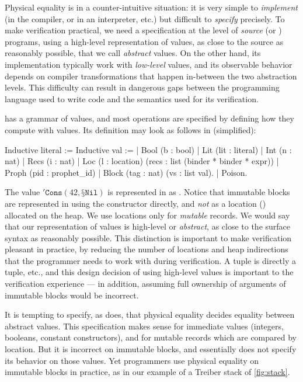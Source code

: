 Physical equality is in a counter-intuitive situation: it is very simple to \emph{implement} (in the \OCaml compiler, or in an interpreter, etc.) but difficult to \emph{specify} precisely. To make verification practical, we need a specification at the level of \emph{source} \OCaml (or \Zoo) programs, using a high-level representation of values, as close to the source as reasonably possible, that we call \emph{abstract} values. On the other hand, its implementation typically work with \emph{low-level} values, and its observable behavior depends on compiler transformations that happen in-between the two abstraction levels.
This difficulty can result in dangerous gaps between the programming language used to write code and the semantics used for its verification.

\ZooLang has a grammar of values, and most operations are specified by defining how they compute with \ZooLang values. Its definition may look as follows in \Rocq (simplified):
\begin{coqcode}
Inductive literal :=            Inductive val :=
 | Bool (b : bool)                | Lit (lit : literal)
 | Int (n : nat)                  | Recs (i : nat)
 | Loc (l : location)                    (recs : list (binder * binder * expr))
 | Proph (pid : prophet_id)       | Block (tag : nat) (vs : list val).
 | Poison.
\end{coqcode}

The value $'\texttt{Cons} (42, \texttt{§}\texttt{Nil})$ is represented in \Rocq as . Notice that immutable blocks are represented in \Rocq using the  constructor directly, and \emph{not} as a location () allocated on the heap. We use locations only for \emph{mutable} records. We would say that our representation of \ZooLang values is high-level or \emph{abstract}, as close to the surface syntax as reasonably possible. This distinction is important to make verification pleasant in practice, by reducing the number of locations and heap indirections that the programmer needs to work with during verification. A \ZooLang tuple is directly a tuple, etc., and this design decision of using high-level values is important to the verification experience --- in addition, assuming full ownership of arguments of immutable blocks would be incorrect.

It is tempting to specify, as \HeapLang does, that physical equality decides equality between abstract values. This specification makes sense for immediate values (integers, booleans, constant constructors), and for mutable records which are compared by location. But it is incorrect on immutable blocks, and \HeapLang essentially does not specify its behavior on those values. Yet programmers use physical equality on immutable blocks in practice, as in our example of a Treiber stack of \cref{fig:stack}.

